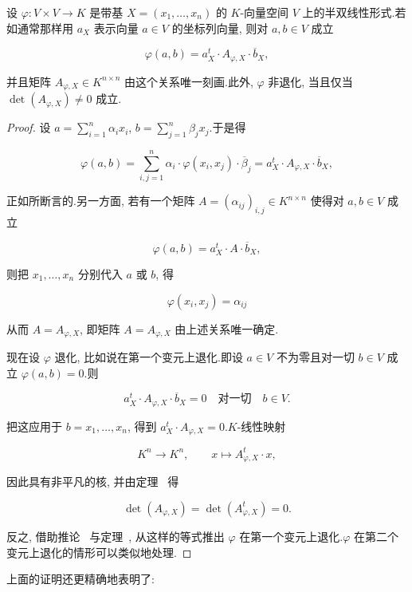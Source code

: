 \begin{theorem}\label{thm:7.3.2}
设 $\varphi \colon V \times V \longrightarrow K$ 是带基 $X = (x_1, \ldots, x_n)$ 的 $K$-向量空间 $V$ 上的半双线性形式.若如通常那样用 $a_X$ 表示向量 $a \in V$ 的坐标列向量, 则对 $a, b \in V$ 成立

\[
\varphi(a, b) = a_X^{t} \cdot A_{\varphi, X} \cdot \overline{b}_X,
\]

并且矩阵 $A_{\varphi, X} \in K^{n \times n}$ 由这个关系唯一刻画.此外, $\varphi$ 非退化, 当且仅当 $\det(A_{\varphi, X}) \neq 0$ 成立.
\end{theorem}

\begin{proof}
设 $a = \sum_{i = 1}^{n} \alpha_i x_i$, $b = \sum_{j = 1}^{n} \beta_j x_j$.于是得

\[
\varphi(a, b) = \sum_{i, j = 1}^{n} \alpha_i \cdot \varphi(x_i, x_j) \cdot \overline{\beta}_j = a_X^{t} \cdot A_{\varphi, X} \cdot \overline{b}_X,
\]

正如所断言的.另一方面, 若有一个矩阵 $A = (\alpha_{ij})_{i, j} \in K^{n \times n}$ 使得对 $a, b \in V$ 成立

\[
\varphi(a, b) = a_X^{t} \cdot A \cdot \overline{b}_X,
\]

则把 $x_1, \ldots, x_n$ 分别代入 $a$ 或 $b$, 得

\[
\varphi(x_i, x_j) = \alpha_{ij}
\]

从而 $A = A_{\varphi, X}$, 即矩阵 $A = A_{\varphi, X}$ 由上述关系唯一确定.

现在设 $\varphi$ 退化, 比如说在第一个变元上退化.即设 $a \in V$ 不为零且对一切 $b \in V$ 成立 $\varphi(a, b) = 0$.则

\[
a_X^{t} \cdot A_{\varphi, X} \cdot \overline{b}_X = 0 \quad \text{对一切} \quad b \in V\text{.}
\]

把这应用于 $b = x_1, \ldots, x_n$, 得到 $a_X^{t} \cdot A_{\varphi, X} = 0$.$K$-线性映射

\[
K^n \longrightarrow K^n, \qquad x \longmapsto A_{\varphi, X}^{t} \cdot x,
\]

因此具有非平凡的核, 并由定理~ 得

\[
\det(A_{\varphi, X}) = \det(A_{\varphi, X}^{t}) = 0\text{.}
\]

反之, 借助推论~ 与定理~, 从这样的等式推出 $\varphi$ 在第一个变元上退化.$\varphi$ 在第二个变元上退化的情形可以类似地处理.
\end{proof}

上面的证明还更精确地表明了:

